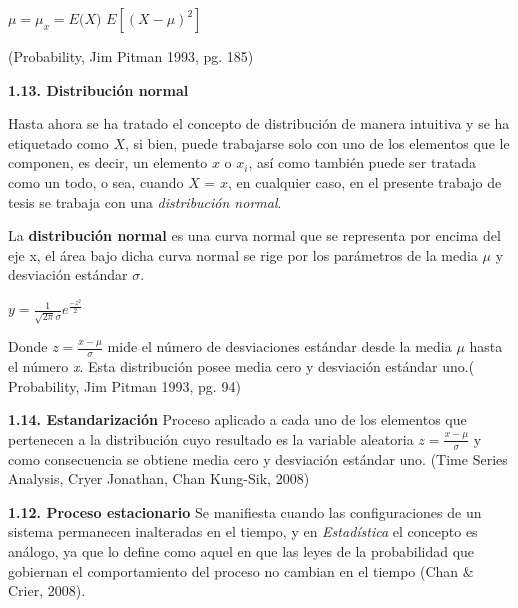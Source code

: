 \begin{center}
\hspace{3cm}$\mu = \mu_x = \textit{E(X)}$
\newline
$E[(X - \mu)^2]$
\end{center}
(Probability, Jim Pitman 1993, pg. 185)
\newpage

{
\Large  \textbf{1.13. Distribución normal} 
}

Hasta ahora se ha tratado el concepto de distribución de manera intuitiva y  se ha etiquetado como $\textit{X}$, si bien, puede trabajarse solo con uno de los elementos que le componen, es decir, un elemento $\textit{x}$ o $\textit{x}_i$, así como también puede ser tratada como un todo, o sea, cuando $\textit{X = x}$, en cualquier caso, en el presente trabajo de tesis se trabaja con una \textit{distribución normal}.

La \textbf{distribución normal} es una curva normal que se representa por encima del eje x, el área bajo dicha curva normal se rige por los parámetros de la media $\mu$ y desviación estándar $\sigma$.

\begin{center}
$y = \frac{1}{\sqrt{2\pi}\sigma} e^{\frac{-z^2}{2}}$
\end{center} 

Donde $z = \frac{x - \mu}{\sigma}$ mide el número de desviaciones estándar desde la media $\mu$ hasta el número \textit{x}. Esta distribución posee media cero y desviación estándar uno.( Probability, Jim Pitman 1993, pg. 94)
\newline

{
\Large  \textbf{1.14. Estandarización} 
} 
\newline
Proceso aplicado a cada uno de los elementos que pertenecen a la distribución cuyo resultado es la variable aleatoria $z = \frac{x - \mu}{\sigma}$ y como consecuencia se obtiene media cero y desviación estándar uno. (Time Series Analysis, Cryer Jonathan, Chan Kung-Sik, 2008)
\newline

{
\Large  \textbf{1.12. Proceso estacionario} 
}
\newline
Se manifiesta cuando las configuraciones de un sistema permanecen inalteradas en el tiempo, y en \textit{Estadística} el concepto es análogo, ya que lo define como \guillemotleft aquel en que las leyes de la probabilidad que gobiernan el comportamiento del proceso no cambian en el tiempo \guillemotright (Chan \& Crier, 2008).
\newpage



